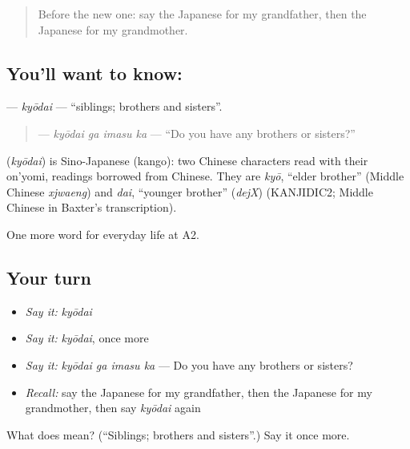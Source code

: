 \begin{quote}
Before the new one: say the Japanese for my grandfather, then the Japanese for my grandmother.
\end{quote}

\subsection*{You'll want to know: }
\textbf{} — \emph{kyōdai} — \textquotedblleft{}siblings; brothers and sisters\textquotedblright{}.

\begin{quote}
\textbf{ } — \emph{kyōdai ga imasu ka} — \textquotedblleft{}Do you have any brothers or sisters?\textquotedblright{}
\end{quote}

\begin{cousinweb}
\textbf{} (\emph{kyōdai}) is Sino-Japanese (kango): two Chinese characters read with their on'yomi, readings borrowed from Chinese. They are \emph{kyō}, \textquotedblleft{}elder brother\textquotedblright{} (Middle Chinese \emph{xjwaeng}) and \emph{dai}, \textquotedblleft{}younger brother\textquotedblright{} (\emph{dejX}) (KANJIDIC2; Middle Chinese in Baxter's transcription).
\end{cousinweb}

\begin{grammarlens}[title={What you've built}]
One more word for everyday life at A2.
\end{grammarlens}

\subsection*{Your turn}
\begin{itemize}
\raggedright
  \item \emph{Say it:} \emph{kyōdai}
  \item \emph{Say it:} \emph{kyōdai}, once more
  \item \emph{Say it:} \emph{kyōdai ga imasu ka} — Do you have any brothers or sisters?
  \item \emph{Recall:} say the Japanese for my grandfather, then the Japanese for my grandmother, then say \emph{kyōdai} again
\end{itemize}

\begin{tcolorbox}[breakable,colback=teal!4,colframe=teal!35!black,title={Before you move on}]
What does  mean? (\textquotedblleft{}Siblings; brothers and sisters\textquotedblright{}.) Say it once more.
\end{tcolorbox}
